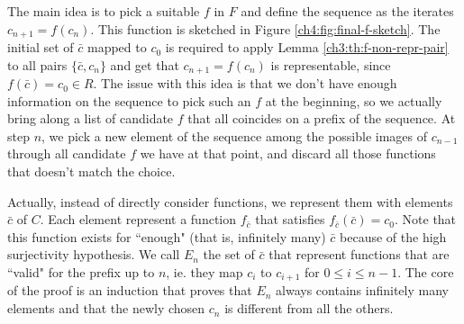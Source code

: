 \begin{figure*}[ht]
	\centering
	\caption{Graphical representation of the ``final" $f$}
	\label{ch4:fig:final-f-sketch}
\end{figure*}

The main idea is to pick a suitable $f$ in $F$ and define the sequence as the iterates $c_{n+1} = f(c_n)$. This function is sketched in Figure \ref{ch4:fig:final-f-sketch}. The initial set of $\bar{c}$ mapped to $c_0$ is required to apply Lemma \ref{ch3:th:f-non-repr-pair} to all pairs $\{ \bar{c}, c_n \}$ and get that $c_{n+1} = f(c_n)$ is representable, since $f(\bar{c}) = c_0 \in R$.
The issue with this idea is that we don't have enough information on the sequence to pick such an $f$ at the beginning, so we actually bring along a list of candidate $f$ that all coincides on a prefix of the sequence. At step $n$, we pick a new element of the sequence among the possible images of $c_{n-1}$ through all candidate $f$ we have at that point, and discard all those functions that doesn't match the choice.

Actually, instead of directly consider functions, we represent them with elements $\bar{c}$ of $C$. Each element represent a function $f_{\bar{c}}$ that satisfies $f_{\bar{c}}(\bar{c}) = c_0$. Note that this function exists for ``enough" (that is, infinitely many) $\bar{c}$ because of the high surjectivity hypothesis. We call $E_n$ the set of $\bar{c}$ that represent functions that are ``valid" for the prefix up to $n$, ie. they map $c_{i}$ to $c_{i+1}$ for $0 \le i \le n - 1$. The core of the proof is an induction that proves that $E_n$ always contains infinitely many elements and that the newly chosen $c_n$ is different from all the others.

